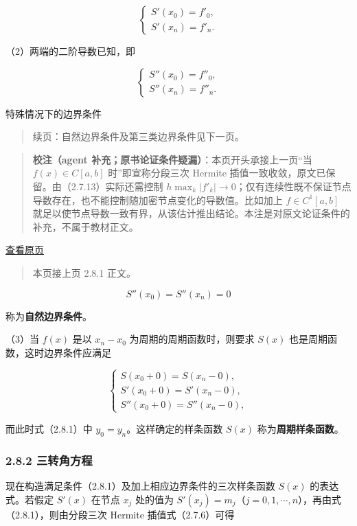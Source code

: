 \documentclass[
  10pt,
  fontset=fandol]{ctexart}
\begin{document}
\[\begin{cases}S'(x_0)=f'_0,\\S'(x_n)=f'_n.\end{cases}\tag{2.8.3}\]

（2）两端的二阶导数已知，即

\[\begin{cases}S''(x_0)=f''_0,\\S''(x_n)=f''_n.\end{cases}\tag{2.8.4}\]

特殊情况下的边界条件

\begin{quote}
续页：自然边界条件及第三类边界条件见下一页。
\end{quote}

\begin{quote}
\textbf{校注（agent 补充；原书论证条件疑漏）}：本页开头承接上一页``当 \(f(x)\in C[a,b]\) 时''即宣称分段三次 Hermite 插值一致收敛，原文已保留。由（2.7.13）实际还需控制 \(h\max_k|f'_k|\to0\)；仅有连续性既不保证节点导数存在，也不能控制随加密节点变化的导数值。比如加上 \(f\in C^1[a,b]\) 就足以使节点导数一致有界，从该估计推出结论。本注是对原文论证条件的补充，不属于教材正文。
\end{quote}

\href{../../source-images/pdf-050.jpeg}{查看原页}

\begin{quote}
本页接上页 2.8.1 正文。
\end{quote}

\[S''(x_0)=S''(x_n)=0\tag{2.8.4'}\]

称为\textbf{自然边界条件}。

（3）当 \(f(x)\) 是以 \(x_n-x_0\) 为周期的周期函数时，则要求 \(S(x)\) 也是周期函数，这时边界条件应满足

\[\begin{cases}
S(x_0+0)=S(x_n-0),\\
S'(x_0+0)=S'(x_n-0),\\
S''(x_0+0)=S''(x_n-0),
\end{cases}\tag{2.8.5}\]

而此时式（2.8.1）中 \(y_0=y_n\)。这样确定的样条函数 \(S(x)\) 称为\textbf{周期样条函数}。

\subsubsection{2.8.2 三转角方程}\label{ux4e09ux8f6cux89d2ux65b9ux7a0b}

现在构造满足条件（2.8.1）及加上相应边界条件的三次样条函数 \(S(x)\) 的表达式。若假定 \(S'(x)\) 在节点 \(x_j\) 处的值为 \(S'(x_j)=m_j\)（\(j=0,1,\cdots,n\)），再由式（2.8.1），则由分段三次 Hermite 插值式（2.7.6）可得
\end{document}
